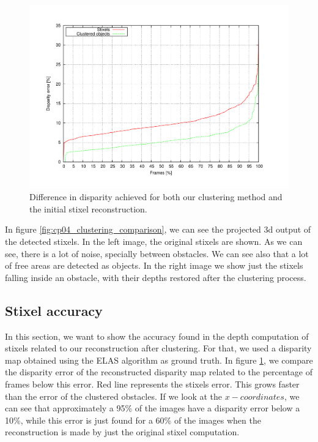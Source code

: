 \begin{figure}[h!t!!!!]
\centering
\includegraphics[width=\textwidth,height=0.5\textwidth,trim=50 40 80 60,clip]{disparity}
\caption{Difference in disparity achieved for both our clustering method and the initial stixel reconstruction.}\label{fig:cp04_disparity_comparison}
\end{figure}

In figure \ref{fig:cp04_clustering_comparison}, we can see the projected 3d output of the detected stixels. In the left image, the original stixels are shown. As we can see, there is a lot of noise, specially between obstacles. We can see also that a lot of free areas are detected as objects. In the right image we show just the stixels falling inside an obstacle, with their depths restored after the clustering process.

\subsection{Stixel accuracy}\label{ch:chapter04_02_02}

In this section, we want to show the accuracy found in the depth computation of stixels related to our reconstruction after clustering. For that, we used a disparity map obtained using the \ac{ELAS} algorithm as ground truth. In figure \ref{fig:cp04_disparity_comparison}, we compare the disparity error of the reconstructed disparity map related to the percentage of frames below this error. Red line represents the stixels error. This grows faster than the error of the clustered obstacles. If we look at the $x-coordinates$, we can see that approximately a 95\% of the images have a disparity error below a 10\%, while this error is just found for a 60\% of the images when the reconstruction is made by just the original stixel computation.

